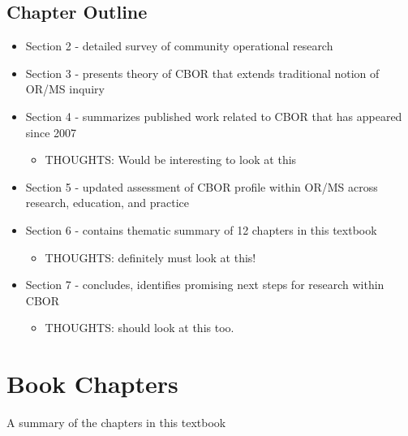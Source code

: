 \documentclass{article}
\begin{document}
\subsection{Chapter Outline}
\begin{itemize}
\item Section 2 - detailed survey of community operational research
\item Section 3 - presents theory of CBOR that extends traditional notion of OR/MS inquiry
\item Section 4 - summarizes published work related to CBOR that has appeared since 2007
	\begin{itemize}
	\item THOUGHTS: Would be interesting to look at this
	\end{itemize}
\item Section 5 - updated assessment of CBOR profile within OR/MS across research, education, and practice
\item Section 6 - contains thematic summary of 12 chapters in this textbook
	\begin{itemize}
	\item THOUGHTS: definitely must look at this!
	\end{itemize}
\item Section 7 - concludes, identifies promising next steps for research within CBOR
	\begin{itemize}
	\item THOUGHTS: should look at this too.
	\end{itemize}
\end{itemize}
\setcounter{section}{6}
\section{Book Chapters}
A summary of the chapters in this textbook
\end{document}
